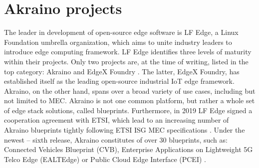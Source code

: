 \documentclass[12pt,a4paper,twoside]{report}
\begin{document}
\section{Akraino projects}
The leader in development of open-source edge software is LF Edge, a Linux Foundation umbrella organization, which aims to unite industry leaders to introduce edge computing framework. LF Edge identifies three levels of maturity within their projects. Only two projects are, at the time of writing, listed in the top category: Akraino and EdgeX Foundry \cite{lf-edge-web}. The latter, EdgeX Foundry, has established itself as the leading open-source industrial IoT edge framework. Akraino, on the other hand, spans over a broad variety of use cases, including but not limited to MEC. Akraino is not one common platform, but rather a whole set of edge stack solutions, called blueprints. Furthermore, in 2019 LF Edge signed a cooperation agreement with ETSI, which lead to an increasing number of Akraino blueprints tightly following ETSI ISG MEC specifications \cite{sabella-mec-sw-dev}. Under the newest – sixth release, Akraino constitutes of over 30 blueprints, such as: Connected Vehicles Blueprint (CVB), Enterprise Applications on Lightweight 5G Telco Edge (EALTEdge) or Public Cloud Edge Interface (PCEI) \cite{lf-edge-web}.
\end{document}
